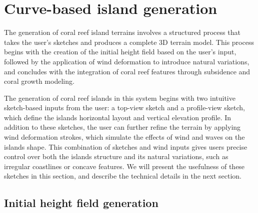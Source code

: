 \section{Curve-based island generation}
\label{sec:coral-island_example-generation}


The generation of coral reef island terrains involves a structured process that takes the user's sketches and produces a complete 3D terrain model. This process begins with the creation of the initial height field based on the user's input, followed by the application of wind deformation to introduce natural variations, and concludes with the integration of coral reef features through subsidence and coral growth modeling.




The generation of coral reef islands in this system begins with two intuitive sketch-based inputs from the user: a top-view sketch and a profile-view sketch, which define the islands horizontal layout and vertical elevation profile. In addition to these sketches, the user can further refine the terrain by applying wind deformation strokes, which simulate the effects of wind and waves on the islands shape. This combination of sketches and wind inputs gives users precise control over both the islands structure and its natural variations, such as irregular coastlines or concave features. We will present the usefulness of these sketches in this section, and describe the technical details in the next section.



\subsection{Initial height field generation}
\label{sec:coral-island_generation-initial}



